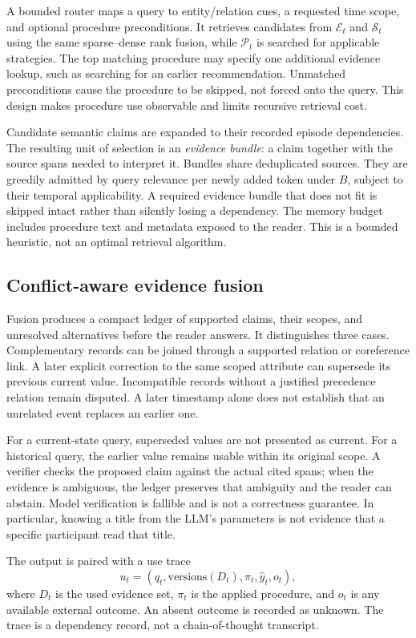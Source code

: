 \documentclass{article}
\newcommand{\E}{\mathcal{E}}
\newcommand{\Sema}{\mathcal{S}}
\newcommand{\Proc}{\mathcal{P}}
\begin{document}
A bounded router maps a query to entity/relation cues, a requested time scope,
and optional procedure preconditions. It retrieves candidates from $\E_t$
and $\Sema_t$ using the same sparse--dense rank fusion, while $\Proc_t$ is
searched for applicable strategies. The top matching procedure may specify
one additional evidence lookup, such as searching for an earlier recommendation.
Unmatched preconditions cause the procedure to be skipped, not forced onto
the query. This design makes procedure use observable and limits recursive
retrieval cost.

Candidate semantic claims are expanded to their recorded episode dependencies.
The resulting unit of selection is an \emph{evidence bundle}: a claim together
with the source spans needed to interpret it. Bundles share deduplicated
sources. They are greedily admitted by query relevance per newly added token
under $B$, subject to their temporal applicability. A required evidence bundle
that does not fit is skipped intact rather than silently losing a dependency.
The memory budget includes procedure text and metadata exposed to the reader.
This is a bounded heuristic, not an optimal retrieval algorithm.

\subsection{Conflict-aware evidence fusion}
Fusion produces a compact ledger of supported claims, their scopes, and
unresolved alternatives before the reader answers. It distinguishes three
cases. Complementary records can be joined through a supported relation or
coreference link. A later explicit correction to the same scoped attribute
can supersede its previous current value. Incompatible records without a
justified precedence relation remain disputed. A later timestamp alone does
not establish that an unrelated event replaces an earlier one.

For a current-state query, superseded values are not presented as current.
For a historical query, the earlier value remains usable within its original
scope. A verifier checks the proposed claim against the actual cited spans;
when the evidence is ambiguous, the ledger preserves that ambiguity and the
reader can abstain. Model verification is fallible and is not a correctness
guarantee. In particular, knowing a title from the LLM's parameters is not
evidence that a specific participant read that title.

The output is paired with a use trace
\begin{equation}
 u_t=(q_t,\mathrm{versions}(D_t),\pi_t,\widehat y_t,o_t),
\end{equation}
where $D_t$ is the used evidence set, $\pi_t$ is the applied procedure, and
$o_t$ is any available external outcome. An absent outcome is recorded as
unknown. The trace is a dependency record, not a chain-of-thought transcript.
\end{document}
